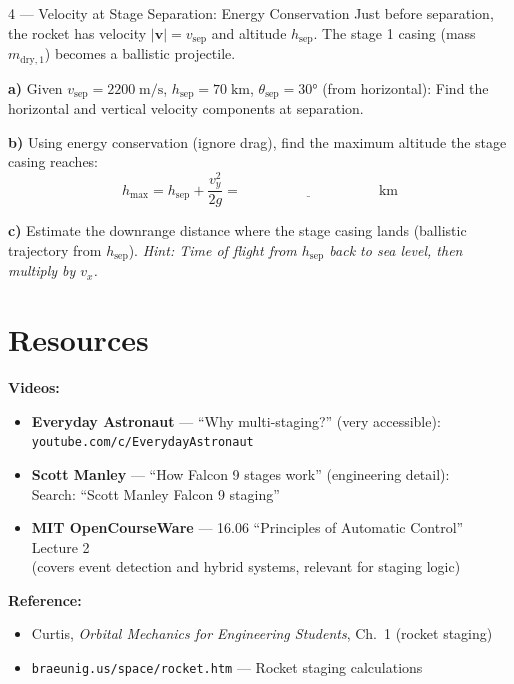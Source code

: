 \documentclass[12pt, a4paper]{article}
\begin{document}
\begin{exercisebox}{4 — Velocity at Stage Separation: Energy Conservation}
Just before separation, the rocket has velocity $|\mathbf{v}| = v_\text{sep}$ and altitude $h_\text{sep}$.
The stage 1 casing (mass $m_{\text{dry},1}$) becomes a ballistic projectile.

\textbf{a)} Given $v_\text{sep} = 2200\;\text{m/s}$, $h_\text{sep} = 70\;\text{km}$, $\theta_\text{sep} = 30°$ (from horizontal):
Find the horizontal and vertical velocity components at separation.

\textbf{b)} Using energy conservation (ignore drag), find the maximum altitude the stage casing reaches:
\[
  h_\text{max} = h_\text{sep} + \frac{v_y^2}{2g} = \underline{\hspace{4cm}}\;\text{km}
\]

\textbf{c)} Estimate the downrange distance where the stage casing lands (ballistic trajectory from $h_\text{sep}$).
\textit{Hint: Time of flight from $h_\text{sep}$ back to sea level, then multiply by $v_x$.}
\end{exercisebox}

\begin{solutionspace}[9cm]
\end{solutionspace}

\section{Resources}

\begin{hintbox}
\textbf{Videos:}
\begin{itemize}
  \item \textbf{Everyday Astronaut} — ``Why multi-staging?'' (very accessible):\\
        \texttt{youtube.com/c/EverydayAstronaut}
  \item \textbf{Scott Manley} — ``How Falcon 9 stages work'' (engineering detail):\\
        Search: ``Scott Manley Falcon 9 staging''
  \item \textbf{MIT OpenCourseWare} — 16.06 ``Principles of Automatic Control'' Lecture 2\\
        (covers event detection and hybrid systems, relevant for staging logic)
\end{itemize}
\textbf{Reference:}
\begin{itemize}
  \item Curtis, \textit{Orbital Mechanics for Engineering Students}, Ch.\ 1 (rocket staging)
  \item \texttt{braeunig.us/space/rocket.htm} — Rocket staging calculations
\end{itemize}
\end{hintbox}
\end{document}
